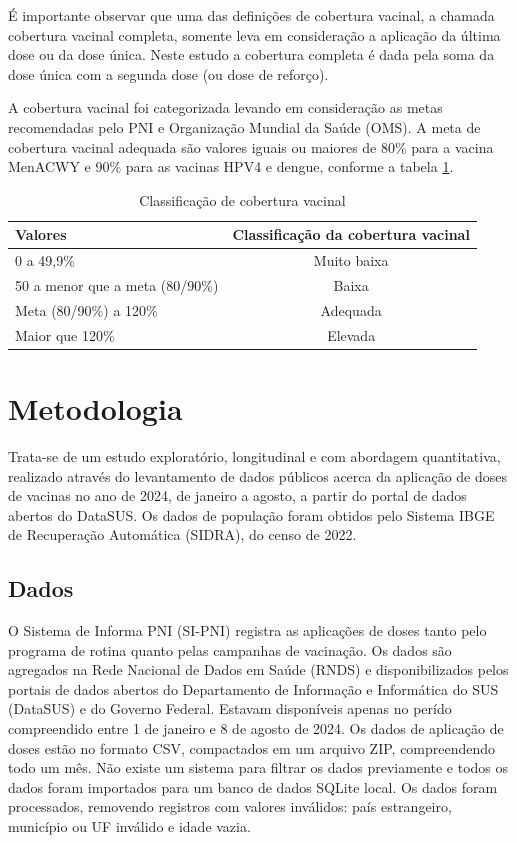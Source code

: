 \documentclass[12pt]{article}
\begin{document}
É importante observar que uma das definições de cobertura vacinal, a chamada cobertura vacinal completa, somente leva em consideração a aplicação da última dose ou da dose única. Neste estudo a cobertura completa é dada pela soma da dose única com a segunda dose (ou dose de reforço).

A cobertura vacinal foi categorizada levando em consideração as metas
recomendadas pelo PNI e Organização Mundial da Saúde (OMS). A meta de cobertura
vacinal adequada são valores iguais ou maiores de 80\% para a vacina MenACWY e 90\% para as vacinas HPV4 e dengue, conforme a tabela \ref{tab:classificacao de cobertura vacinal}.

\begin{table}[ht]
    \centering
    \caption{Classificação de cobertura vacinal}
    \label{tab:classificacao de cobertura vacinal}
    \begin{tabular}{lc}
        \hline
        \rule[-1ex]{0pt}{2.5ex} \textbf{Valores} & \textbf{Classificação da cobertura vacinal} \\
        \hline
        \rule[-1ex]{0pt}{2.5ex} 0 a 49,9\% & Muito baixa \\
        \hline
        \rule[-1ex]{0pt}{2.5ex} 50 a menor que a meta (80/90\%) & Baixa \\
        \hline
        \rule[-1ex]{0pt}{2.5ex} Meta (80/90\%) a 120\% & Adequada \\
        \hline
        \rule[-1ex]{0pt}{2.5ex} Maior que 120\% & Elevada \\
        \hline
    \end{tabular}
\end{table}

\section{Metodologia} \label{sec:metodologia}
Trata-se de um estudo exploratório, longitudinal e com abordagem quantitativa, realizado através do levantamento de dados públicos acerca da aplicação de doses de vacinas no ano de 2024, de janeiro a agosto, a partir do portal de dados abertos do DataSUS. Os dados de população foram obtidos pelo Sistema IBGE de Recuperação Automática (SIDRA), do censo de 2022.

\subsection{Dados}
O Sistema de Informa PNI (SI-PNI) registra as aplicações de doses tanto pelo programa de rotina quanto pelas campanhas de vacinação. Os dados são agregados na Rede Nacional de Dados em Saúde (RNDS) e disponibilizados pelos portais de dados abertos do Departamento de Informação e Informática do SUS (DataSUS) e do Governo Federal. Estavam disponíveis apenas no perído compreendido entre 1 de janeiro e 8 de agosto de 2024. Os dados de aplicação de doses estão no formato CSV, compactados em um arquivo ZIP, compreendendo todo um mês. Não existe um sistema para filtrar os dados previamente e todos os dados foram importados para um banco de dados SQLite local. Os dados foram processados, removendo registros com valores inválidos: país estrangeiro, município ou UF inválido e idade vazia.
\end{document}
